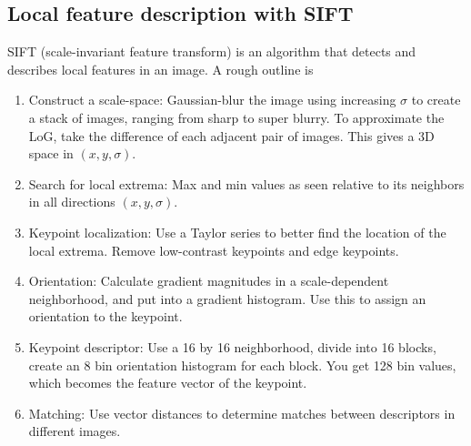 \subsection{Local feature description with SIFT}\label{ssec:sift}
SIFT (scale-invariant feature transform) is an algorithm that detects and describes local features in an image. A rough outline is
\begin{enumerate}
    \item Construct a scale-space: Gaussian-blur the image using increasing $\sigma$ to create a stack of images, ranging from sharp to super blurry. To approximate the LoG, take the difference of each adjacent pair of images. This gives a 3D space in $(x,y,\sigma)$.
    \item Search for local extrema: Max and min values as seen relative to its neighbors in all directions $(x,y,\sigma)$.
    \item Keypoint localization: Use a Taylor series to better find the location of the local extrema. Remove low-contrast keypoints and edge keypoints.
    \item Orientation: Calculate gradient magnitudes in a scale-dependent neighborhood, and put into a gradient histogram. Use this to assign an orientation to the keypoint.
    \item Keypoint descriptor: Use a 16 by 16 neighborhood, divide into 16 blocks, create an 8 bin orientation histogram for each block. You get 128 bin values, which becomes the feature vector of the keypoint.
    \item Matching: Use vector distances to determine matches between descriptors in different images.
\end{enumerate}
